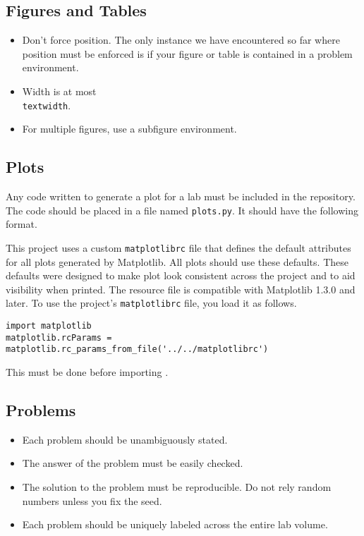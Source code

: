 \subsection{Figures and Tables}
\begin{itemize}
\item Don't force position.  The only instance we have encountered so far where position must be enforced is if your figure or table is contained in a problem environment.
\item Width is at most \texttt{\\textwidth}.
\item For multiple figures, use a subfigure environment.
\end{itemize}


\subsection{Plots}
Any code written to generate a plot for a lab must be included in the repository.
The code should be placed in a file named \texttt{plots.py}.
It should have the following format.


This project uses a custom \texttt{matplotlibrc} file that defines the default attributes for all plots generated by Matplotlib.
All plots should use these defaults.
These defaults were designed to make plot look consistent across the project and to aid visibility when printed.
The resource file is compatible with Matplotlib 1.3.0 and later.
To use the project's \texttt{matplotlibrc} file, you load it as follows.
\begin{lstlisting}
import matplotlib
matplotlib.rcParams = matplotlib.rc_params_from_file('../../matplotlibrc')
\end{lstlisting}
This must be done before importing .

\subsection{Problems}
\begin{itemize}
\item Each problem should be unambiguously stated.
\item The answer of the problem must be easily checked.
\item The solution to the problem must be reproducible.  Do not rely random numbers unless you fix the seed.
\item Each problem should be uniquely labeled across the entire lab volume.
\end{itemize}
